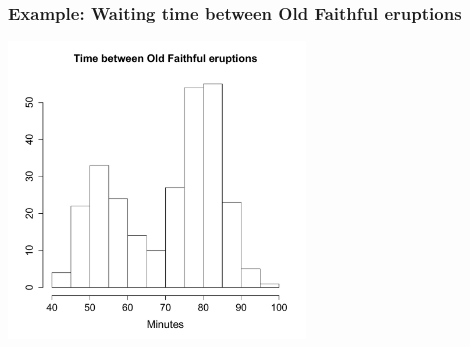 \documentclass{beamer}
\begin{document}
\begin{frame}
  \frametitle{Example: Waiting time between Old Faithful eruptions}

\begin{center}
\includegraphics[height=3.1in]{waitingtime.pdf}    
\end{center}

\end{frame}
\end{document}
